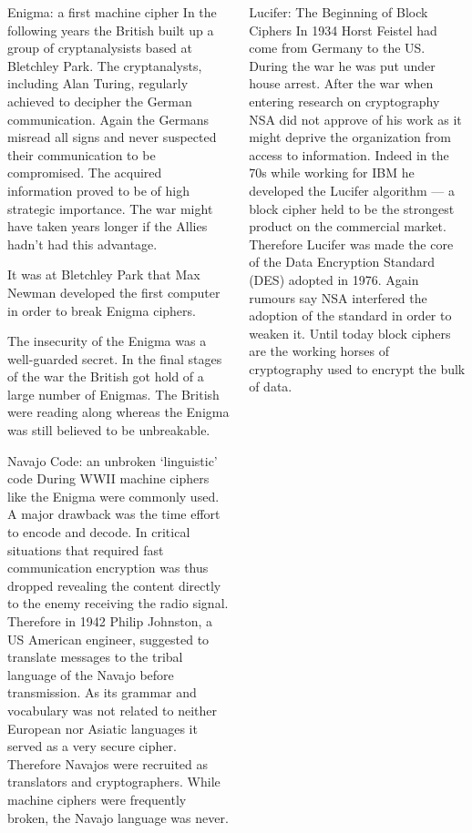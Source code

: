 \documentclass[final,hyperref={pdfpagelabels=false}]{beamer}
\begin{document}
\begin{frame}{}
\begin{columns}[t]
\begin{column}{.3\linewidth}
\begin{block}{Enigma: a first machine cipher}
          In the following years the British built up a group of cryptanalysists based at Bletchley Park. The cryptanalysts, including Alan Turing, regularly achieved to decipher the German communication. Again the Germans misread all signs and never suspected their communication to be compromised. The acquired information proved to be of high strategic importance. The war might have taken years longer if the Allies hadn't had this advantage.\par
          It was at Bletchley Park that Max Newman developed the first computer in order to break Enigma ciphers.\par
          The insecurity of the Enigma was a well-guarded secret. In the final stages of the war the British got hold of a large number of Enigmas. The British were reading along whereas the Enigma was still believed to be unbreakable.
        \end{block}
        \begin{block}{Navajo Code: an unbroken `linguistic' code}
          During WWII machine ciphers like the Enigma were commonly used. A major drawback was the time effort to encode and decode. In critical situations that required fast communication encryption was thus dropped revealing the content directly to the enemy receiving the radio signal. Therefore in 1942 Philip Johnston, a US American engineer, suggested to translate messages to the tribal language of the Navajo before transmission. As its grammar and vocabulary was not related to neither European nor Asiatic languages it served as a very secure cipher. Therefore Navajos were recruited as translators and cryptographers. While machine ciphers were frequently broken, the Navajo language was never.
        \end{block}

    \end{column}
    \begin{column}{.3\linewidth}
        \begin{block}{Lucifer: The Beginning of Block Ciphers}
          In 1934 Horst Feistel had come from Germany to the US. During the war he was put under house arrest. After the war when entering research on cryptography NSA did not approve of his work as it might deprive the organization from access to information. Indeed in the 70s while working for IBM he developed the Lucifer algorithm --- a block cipher held to be the strongest product on the commercial market. Therefore Lucifer was made the core of the Data Encryption Standard (DES) adopted in 1976. Again rumours say NSA interfered the adoption of the standard in order to weaken it. Until today block ciphers are the working horses of cryptography used to encrypt the bulk of data.
        \end{block}


\end{column}
\end{columns}
\end{frame}
\end{document}
